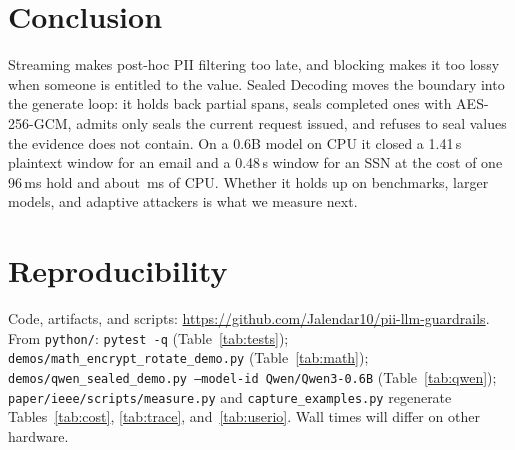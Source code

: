 \documentclass[conference]{IEEEtran}
\newcommand{\code}[1]{\texttt{#1}}
\begin{document}
\section{Conclusion}

Streaming makes post-hoc PII filtering too late, and blocking makes it too lossy when someone is entitled to the value. Sealed Decoding moves the boundary into the generate loop: it holds back partial spans, seals completed ones with AES-256-GCM, admits only seals the current request issued, and refuses to seal values the evidence does not contain. On a 0.6B model on CPU it closed a 1.41\,s plaintext window for an email and a 0.48\,s window for an SSN at the cost of one 96\,ms hold and about \mhookMs\,ms of CPU. Whether it holds up on benchmarks, larger models, and adaptive attackers is what we measure next.

\section*{Reproducibility}
Code, artifacts, and scripts: \url{https://github.com/Jalendar10/pii-llm-guardrails}. From \code{python/}: \code{pytest -q} (Table~\ref{tab:tests}); \code{demos/math\_encrypt\_rotate\_demo.py} (Table~\ref{tab:math}); \code{demos/qwen\_sealed\_demo.py --model-id Qwen/Qwen3-0.6B} (Table~\ref{tab:qwen}); \code{paper/ieee/scripts/measure.py} and \code{capture\_examples.py} regenerate Tables~\ref{tab:cost}, \ref{tab:trace}, and~\ref{tab:userio}. Wall times will differ on other hardware.

\balance


\end{document}
